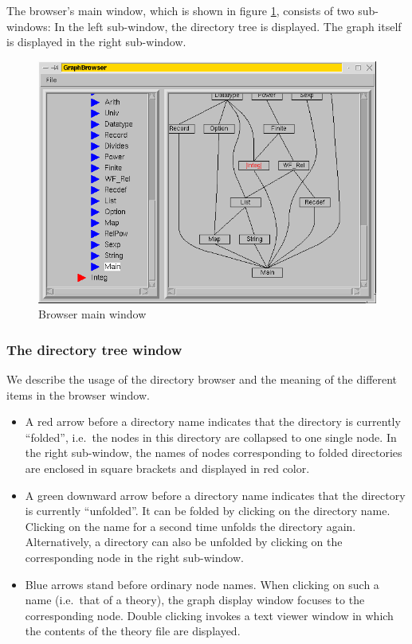 The browser's main window, which is shown in figure
\ref{browserwindow}, consists of two sub-windows: In the left
sub-window, the directory tree is displayed. The graph itself is
displayed in the right sub-window.
\begin{figure}[ht]
  \includegraphics[width=\textwidth]{browser_screenshot}
  \caption{\label{browserwindow} Browser main window}
\end{figure}


\subsubsection*{The directory tree window}

We describe the usage of the directory browser and the meaning of the
different items in the browser window.
\begin{itemize}
  
\item A red arrow before a directory name indicates that the directory
  is currently ``folded'', i.e.~the nodes in this directory are
  collapsed to one single node. In the right sub-window, the names of
  nodes corresponding to folded directories are enclosed in square
  brackets and displayed in red color.
  
\item A green downward arrow before a directory name indicates that
  the directory is currently ``unfolded''. It can be folded by
  clicking on the directory name.  Clicking on the name for a second
  time unfolds the directory again.  Alternatively, a directory can
  also be unfolded by clicking on the corresponding node in the right
  sub-window.
  
\item Blue arrows stand before ordinary node names. When clicking on such a
  name (i.e.\ that of a theory), the graph display window focuses to the
  corresponding node. Double clicking invokes a text viewer window in which
  the contents of the theory file are displayed.

\end{itemize}


